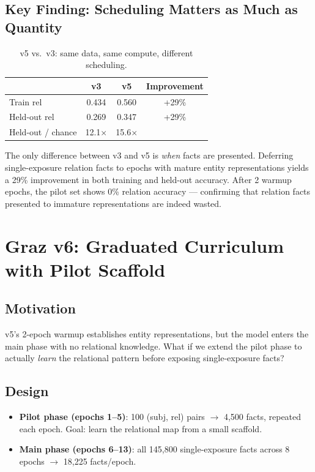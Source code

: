 \documentclass[11pt]{article}
\begin{document}
\subsection{Key Finding: Scheduling Matters as Much as Quantity}

\begin{table}[h]
\centering
\caption{v5 vs.\ v3: same data, same compute, different scheduling.}
\begin{tabular}{lccc}
\toprule
& v3 & v5 & Improvement \\
\midrule
Train rel & 0.434 & 0.560 & +29\% \\
Held-out rel & 0.269 & 0.347 & +29\% \\
Held-out / chance & 12.1$\times$ & 15.6$\times$ & \\
\bottomrule
\end{tabular}
\end{table}

The only difference between v3 and v5 is \emph{when} facts are presented.  Deferring
single-exposure relation facts to epochs with mature entity representations yields a
29\% improvement in both training and held-out accuracy.  After 2 warmup epochs, the
pilot set shows 0\% relation accuracy --- confirming that relation facts presented to
immature representations are indeed wasted.

\section{Graz v6: Graduated Curriculum with Pilot Scaffold}
\label{sec:v6}

\subsection{Motivation}

v5's 2-epoch warmup establishes entity representations, but the model enters the main
phase with no relational knowledge.  What if we extend the pilot phase to actually
\emph{learn} the relational pattern before exposing single-exposure facts?

\subsection{Design}

\begin{itemize}
\item \textbf{Pilot phase (epochs 1--5)}: 100 (subj, rel) pairs $\to$ 4,500 facts,
  repeated each epoch.  Goal: learn the relational map from a small scaffold.
\item \textbf{Main phase (epochs 6--13)}: all 145,800 single-exposure facts across
  8 epochs $\to$ 18,225 facts/epoch.
\end{itemize}
\end{document}
